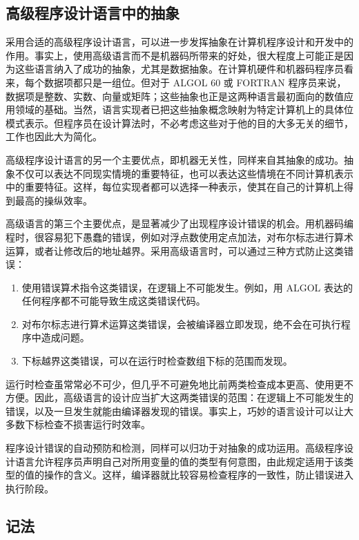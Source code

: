\subsection{高级程序设计语言中的抽象}

采用合适的高级程序设计语言，可以进一步发挥抽象在计算机程序设计和开发中的作用。事实上，使用高级语言而不是机器码所带来的好处，很大程度上可能正是因为这些语言纳入了成功的抽象，尤其是数据抽象。在计算机硬件和机器码程序员看来，每个数据项都只是一组位。但对于 ALGOL 60 或 FORTRAN 程序员来说，数据项是整数、实数、向量或矩阵；这些抽象也正是这两种语言最初面向的数值应用领域的基础。当然，语言实现者已把这些抽象概念映射为特定计算机上的具体位模式表示。但程序员在设计算法时，不必考虑这些对于他的目的大多无关的细节，工作也因此大为简化。

高级程序设计语言的另一个主要优点，即机器无关性，同样来自其抽象的成功。抽象不仅可以表达不同现实情境的重要特征，也可以表达这些情境在不同计算机表示中的重要特征。这样，每位实现者都可以选择一种表示，使其在自己的计算机上得到最高的操纵效率。

高级语言的第三个主要优点，是显著减少了出现程序设计错误的机会。用机器码编程时，很容易犯下愚蠢的错误，例如对浮点数使用定点加法，对布尔标志进行算术运算，或者让修改后的地址越界。采用高级语言时，可以通过三种方式防止这类错误：

\begin{enumerate}[wide, nosep, label=(\arabic*)]
	\item 使用错误算术指令这类错误，在逻辑上不可能发生。例如，用 ALGOL 表达的任何程序都不可能导致生成这类错误代码。
	\item 对布尔标志进行算术运算这类错误，会被编译器立即发现，绝不会在可执行程序中造成问题。
	\item 下标越界这类错误，可以在运行时检查数组下标的范围而发现。
\end{enumerate}

运行时检查虽常常必不可少，但几乎不可避免地比前两类检查成本更高、使用更不方便。因此，高级语言的设计应当扩大这两类错误的范围：在逻辑上不可能发生的错误，以及一旦发生就能由编译器发现的错误。事实上，巧妙的语言设计可以让大多数下标检查不损害运行时效率。

程序设计错误的自动预防和检测，同样可以归功于对抽象的成功运用。高级程序设计语言允许程序员声明自己对所用变量的值的类型有何意图，由此规定适用于该类型的值的操作的含义。这样，编译器就比较容易检查程序的一致性，防止错误进入执行阶段。

\subsection{记法}

